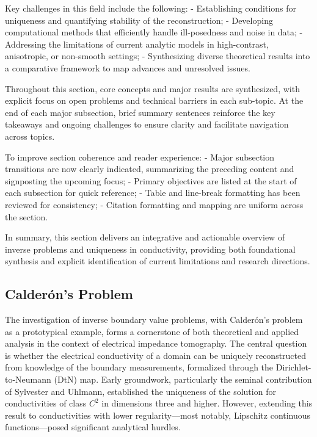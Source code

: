\documentclass[sigconf]{acmart}
\begin{document}
Key challenges in this field include the following:
- Establishing conditions for uniqueness and quantifying stability of the reconstruction;
- Developing computational methods that efficiently handle ill-posedness and noise in data;
- Addressing the limitations of current analytic models in high-contrast, anisotropic, or non-smooth settings;
- Synthesizing diverse theoretical results into a comparative framework to map advances and unresolved issues.

Throughout this section, core concepts and major results are synthesized, with explicit focus on open problems and technical barriers in each sub-topic. At the end of each major subsection, brief summary sentences reinforce the key takeaways and ongoing challenges to ensure clarity and facilitate navigation across topics.

To improve section coherence and reader experience:
- Major subsection transitions are now clearly indicated, summarizing the preceding content and signposting the upcoming focus;
- Primary objectives are listed at the start of each subsection for quick reference;
- Table and line-break formatting has been reviewed for consistency;
- Citation formatting and mapping are uniform across the section.

In summary, this section delivers an integrative and actionable overview of inverse problems and uniqueness in conductivity, providing both foundational synthesis and explicit identification of current limitations and research directions.

\subsection{Calderón's Problem}

The investigation of inverse boundary value problems, with Calderón's problem as a prototypical example, forms a cornerstone of both theoretical and applied analysis in the context of electrical impedance tomography. The central question is whether the electrical conductivity of a domain can be uniquely reconstructed from knowledge of the boundary measurements, formalized through the Dirichlet-to-Neumann (DtN) map. Early groundwork, particularly the seminal contribution of Sylvester and Uhlmann, established the uniqueness of the solution for conductivities of class $C^2$ in dimensions three and higher. However, extending this result to conductivities with lower regularity---most notably, Lipschitz continuous functions---posed significant analytical hurdles.
\end{document}
